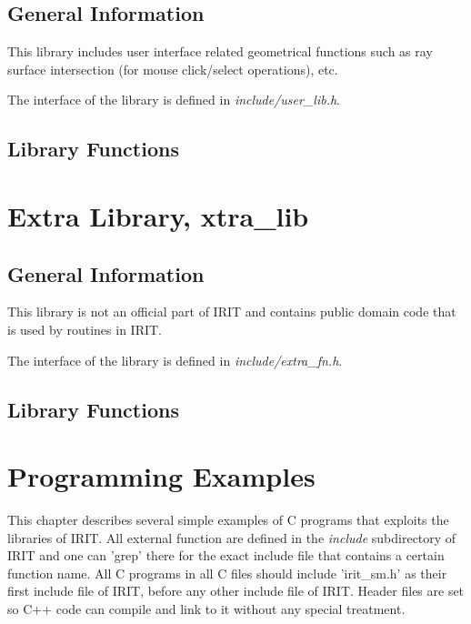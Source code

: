 {\section{General Information}

This library includes user interface related geometrical functions such
as ray surface intersection (for mouse click/select operations), etc.

The interface of the library is defined in {\em include/user\_lib.h}. 

\section{Library Functions}


\chapter{Extra Library, xtra\_lib}

\section{General Information}

This library is not an official part of IRIT and contains public
domain code that is used by routines in IRIT.

The interface of the library is defined in {\em include/extra\_fn.h}. 

\section{Library Functions}


\chapter{Programming Examples}
\label{chap-examples}

This chapter describes several simple examples of C programs that
exploits the libraries of IRIT. All external function are defined in
the {\em include} subdirectory of IRIT and one can 'grep' there for the
exact include file that contains a certain function name. All C programs
in all C files should include 'irit\_sm.h' as their first include file
of IRIT, before any other include file of IRIT. Header files are set so
C++ code can compile and link to it without any special treatment.

}
